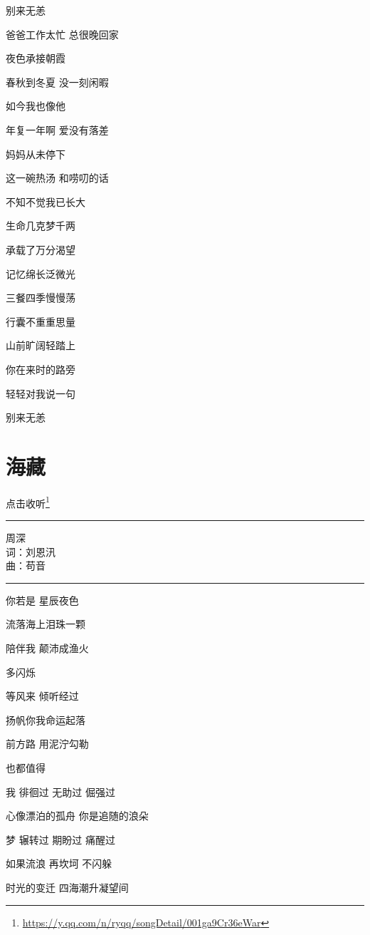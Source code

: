 \documentclass[]{ctexbook}
\renewcommand{\href}[2]{#2\footnote{\url{#1}}}
\begin{document}
别来无恙

爸爸工作太忙 总很晚回家

夜色承接朝霞

春秋到冬夏 没一刻闲暇

如今我也像他

年复一年啊 爱没有落差

妈妈从未停下

这一碗热汤 和唠叨的话

不知不觉我已长大

生命几克梦千两

承载了万分渴望

记忆绵长泛微光

三餐四季慢慢荡

行囊不重重思量

山前旷阔轻踏上

你在来时的路旁

轻轻对我说一句

别来无恙

\section*{海藏}\label{ocean-treasure}


\href{https://y.qq.com/n/ryqq/songDetail/001ga9Cr36eWar}{点击收听}

\begin{center}\rule{0.5\linewidth}{0.5pt}\end{center}

周深\\
词：刘恩汛\\
曲：苟音

\begin{center}\rule{0.5\linewidth}{0.5pt}\end{center}

你若是 星辰夜色

流落海上泪珠一颗

陪伴我 颠沛成渔火

多闪烁

等风来 倾听经过

扬帆你我命运起落

前方路 用泥泞勾勒

也都值得

我 徘徊过 无助过 倔强过

心像漂泊的孤舟 你是追随的浪朵

梦 辗转过 期盼过 痛醒过

如果流浪 再坎坷 不闪躲

时光的变迁 四海潮升凝望间
\end{document}
